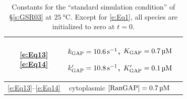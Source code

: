 \documentclass[12pt,notitlepage]{article}
\begin{document}
\begin{table}
\begin{tabular}{c|c|c}
	\makecell{
		\eqref{e:Eq13} \\ \eqref{e:Eq14}
	}
	&
	\makecell{
		$k_{\ce{GAP}} = \SI{10.6}{s^{-1}}$,
		\quad
		$K_{\ce{GAP}} = \SI{0.7}{\micro M}$
		\\
		$k_{\ce{GAP}}' = \SI{10.8}{s^{-1}}$,
		\quad
		$K_{\ce{GAP}}' = \SI{0.1}{\micro M}$
	}
	&
	\makecell{
		\cite[Supp.~Table~A]{GoerlichSeewaldRibbeck2003}
		\\
		\cite[Table~I]{GoerlichSeewaldRibbeck2003}
	}
	\\
	\hline
	\eqref{e:Eq13}--\eqref{e:Eq14}
	&
	cytoplasmic
	$[\ce{RanGAP}] = \SI{0.7}{\micro M}$
	&
	\cite[Table~II / ST~B]{GoerlichSeewaldRibbeck2003}
	\\
	\hline
\end{tabular}
%
\caption{%
	Constants
	for the ``standard simulation condition''
	of \S\ref{s:GSR03}
	at $\SI{25}{\celsius}$.
	Except for \eqref{e:Eq1},
	all species are initialized to zero at $t = 0$.
}
%
\label{t:GSR-const}
\end{table}
\end{document}
